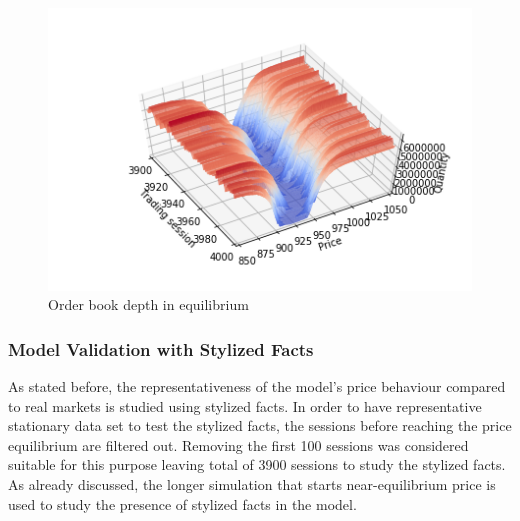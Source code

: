 \begin{figure}[H]
    \includegraphics[width=\linewidth]{plots/basic_market_depth_in_equilibrium.png}
    \caption{Order book depth in equilibrium}
    \label{fig:basic_orderbook_evo}
\end{figure}


\subsubsection{Model Validation with Stylized Facts}
As stated before, the representativeness of the model's price behaviour compared to real markets 
is studied using stylized facts. In order to have representative stationary data set to 
test the stylized facts, the sessions before reaching the price equilibrium are filtered out.
Removing the first 100 sessions was considered suitable for this purpose leaving total of 3900 
sessions to study the stylized facts. 
As already discussed, the longer simulation that starts near-equilibrium 
price is used to study the presence of stylized facts in the model. 

